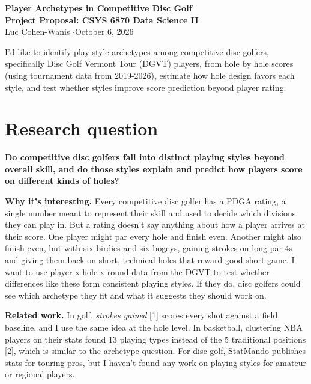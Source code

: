 \documentclass[10pt]{article}
\begin{document}
\begin{center}
  \vspace*{-2.2em}
  {\Large\bfseries Player Archetypes in Competitive Disc Golf}\\[3pt]
  {\large\bfseries Project Proposal: CSYS 6870 Data Science II}\\[3pt]
  Luc Cohen-Wanis \quad$\cdot$\quad October 6, 2026
\end{center}
\vspace{-0.4em}

I'd like to identify play style archetypes among competitive disc golfers, specifically Disc Golf Vermont Tour (DGVT) players, from hole by hole scores (using tournament data from 2019-2026), estimate how hole design favors each style, and test whether styles improve score prediction beyond player rating.

\section{Research question}

\textbf{Do competitive disc golfers fall into distinct playing styles beyond overall skill, and do those styles explain and predict how players score on different kinds of holes?}

\textbf{Why it's interesting.}
Every competitive disc golfer has a PDGA rating, a single number meant to represent their skill and used to decide which divisions they can play in. But a rating doesn't say anything about how a player arrives at their score. One player might par every hole and finish even. Another might also finish even, but with six birdies and six bogeys, gaining strokes on long par 4s and giving them back on short, technical holes that reward good short game. I want to use player x hole x round data from the DGVT to test whether differences like these form consistent playing styles. If they do, disc golfers could see which archetype they fit and what it suggests they should work on.

\textbf{Related work.}
In golf, \emph{strokes gained} [1] scores every shot against a field baseline,
and I use the same idea at the hole level. In basketball, clustering NBA
players on their stats found 13 playing types instead of the 5 traditional
positions [2], which is similar to the archetype question. For disc golf,
\href{https://statmando.com/stats/}{StatMando} publishes stats for touring pros, but I haven't found any work on playing styles for amateur or regional players.
\end{document}
